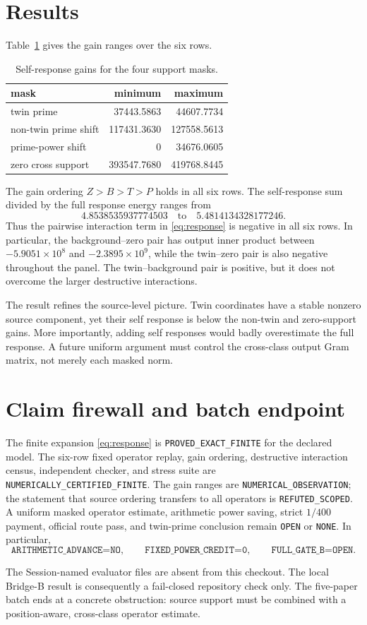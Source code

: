 \documentclass[10pt]{article}
\begin{document}
\section{Results}
Table~\ref{tab:gains} gives the gain ranges over the six rows.
\begin{table}[ht]
\centering\small
\caption{Self-response gains for the four support masks.}
\label{tab:gains}
\begin{tabular}{lrr}
\toprule
mask & minimum & maximum\\
\midrule
twin prime & 37443.5863 & 44607.7734\\
non-twin prime shift & 117431.3630 & 127558.5613\\
prime-power shift & 0 & 34676.0605\\
zero cross support & 393547.7680 & 419768.8445\\
\bottomrule
\end{tabular}
\end{table}

The gain ordering $Z>B>T>P$ holds in all six rows.  The self-response sum
divided by the full response energy ranges from
\[
 4.8538535937774503\quad\text{to}\quad5.4814134328177246.
\]
Thus the pairwise interaction term in \eqref{eq:response} is negative in all
six rows.  In particular, the background--zero pair has output inner product
between $-5.9051\times10^8$ and $-2.3895\times10^9$, while the twin--zero
pair is also negative throughout the panel.  The twin--background pair is
positive, but it does not overcome the larger destructive interactions.

The result refines the source-level picture.  Twin coordinates have a stable
nonzero source component, yet their self response is below the non-twin and
zero-support gains.  More importantly, adding self responses would badly
overestimate the full response.  A future uniform argument must control the
cross-class output Gram matrix, not merely each masked norm.

\section{Claim firewall and batch endpoint}
The finite expansion \eqref{eq:response} is
\texttt{PROVED\_EXACT\_FINITE} for the declared model.  The six-row fixed
operator replay, gain ordering, destructive interaction census, independent
checker, and stress suite are \texttt{NUMERICALLY\_CERTIFIED\_FINITE}.  The
gain ranges are \texttt{NUMERICAL\_OBSERVATION}; the statement that source
ordering transfers to all operators is \texttt{REFUTED\_SCOPED}.  A uniform
masked operator estimate, arithmetic power saving, strict $1/400$ payment,
official route pass, and twin-prime conclusion remain \texttt{OPEN} or
\texttt{NONE}.  In particular,
\[
 \texttt{ARITHMETIC\_ADVANCE=NO},\qquad
 \texttt{FIXED\_POWER\_CREDIT=0},\qquad
 \texttt{FULL\_GATE\_B=OPEN}.
\]

The Session-named evaluator files are absent from this checkout.  The local
Bridge-B result is consequently a fail-closed repository check only.  The
five-paper batch ends at a concrete obstruction: source support must be
combined with a position-aware, cross-class operator estimate.
\end{document}

